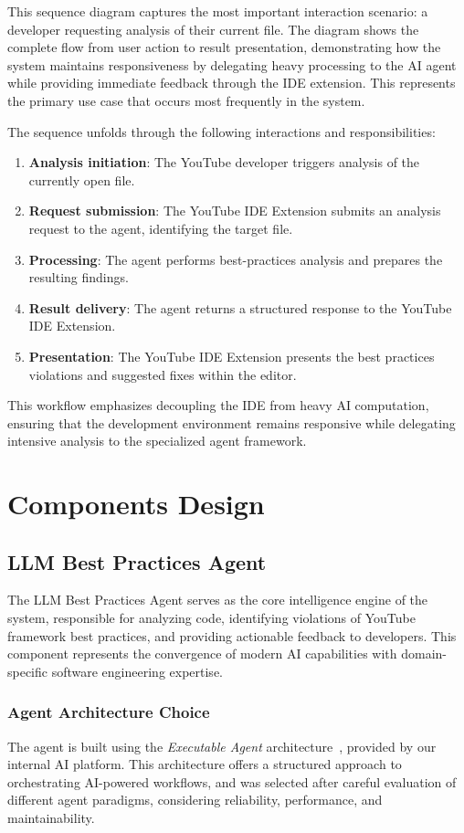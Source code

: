 \begin{spacing}{1.2}
This sequence diagram captures the most important interaction scenario: a developer requesting analysis of their current file. The diagram shows the complete flow from user action to result presentation, demonstrating how the system maintains responsiveness by delegating heavy processing to the AI agent while providing immediate feedback through the IDE extension. This represents the primary use case that occurs most frequently in the system.

The sequence unfolds through the following interactions and responsibilities:
\begin{enumerate}
    \item \textbf{Analysis initiation}: The YouTube developer triggers analysis of the currently open file.
    \item \textbf{Request submission}: The YouTube IDE Extension submits an analysis request to the agent, identifying the target file.
    \item \textbf{Processing}: The agent performs best-practices analysis and prepares the resulting findings.
    \item \textbf{Result delivery}: The agent returns a structured response to the YouTube IDE Extension.
    \item \textbf{Presentation}: The YouTube IDE Extension presents the best practices violations and suggested fixes within the editor.
\end{enumerate}

This workflow emphasizes decoupling the IDE from heavy AI computation, ensuring that the development environment remains responsive while delegating intensive analysis to the specialized agent framework.

\section{Components Design}

\subsection{LLM Best Practices Agent} 
The LLM Best Practices Agent serves as the core intelligence engine of the system, responsible for analyzing code, identifying violations of YouTube framework best practices, and providing actionable feedback to developers. This component represents the convergence of modern AI capabilities with domain-specific software engineering expertise.

\subsubsection{Agent Architecture Choice}
The agent is built using the \textit{Executable Agent} architecture~\cite{microsoftAgentPatterns}, provided by our internal AI platform. This architecture offers a structured approach to orchestrating AI-powered workflows, and was selected after careful evaluation of different agent paradigms, considering reliability, performance, and maintainability.


\end{spacing}
